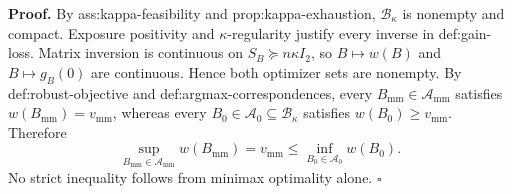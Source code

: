 \textbf{Proof.}
By ass:kappa-feasibility and prop:kappa-exhaustion, \(\mathcal B_\kappa\) is nonempty and compact. Exposure positivity and \(\kappa\)-regularity justify every inverse in def:gain-loss. Matrix inversion is continuous on \(S_B\succeq n\kappa I_2\), so \(B\mapsto w(B)\) and \(B\mapsto g_B(0)\) are continuous. Hence both optimizer sets are nonempty. By def:robust-objective and def:argmax-correspondences, every \(B_{\mathrm{mm}}\in\mathcal A_{\mathrm{mm}}\) satisfies \(w(B_{\mathrm{mm}})=v_{\mathrm{mm}}\), whereas every \(B_0\in\mathcal A_0\subseteq\mathcal B_\kappa\) satisfies \(w(B_0)\ge v_{\mathrm{mm}}\). Therefore
\[
\sup_{B_{\mathrm{mm}}\in\mathcal A_{\mathrm{mm}}}w(B_{\mathrm{mm}})
=v_{\mathrm{mm}}
\le\inf_{B_0\in\mathcal A_0}w(B_0).
\]
No strict inequality follows from minimax optimality alone. \(\square\)